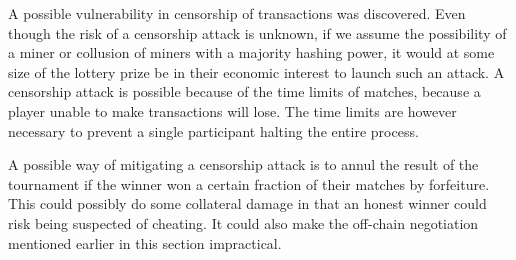 A possible vulnerability in censorship of transactions was discovered. Even though the risk of a censorship attack is unknown, if we assume the possibility of a miner or collusion of miners with a majority hashing power, it would at some size of the lottery prize be in their economic interest to launch such an attack. A censorship attack is possible because of the time limits of matches, because a player unable to make transactions will lose. The time limits are however necessary to prevent a single participant halting the entire process. 

A possible way of mitigating a censorship attack is to annul the result of the tournament if the winner won a certain fraction of their matches by forfeiture. This could possibly do some collateral damage in that an honest winner could risk being suspected of cheating. It could also make the off-chain negotiation mentioned earlier in this section impractical. 